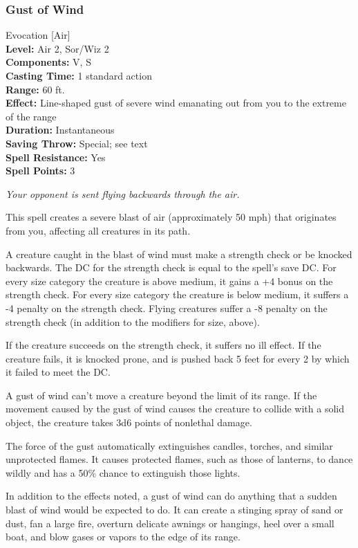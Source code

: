 \subsubsection{Gust of Wind}
\label{Spell:GustOfWind}
Evocation [Air]
\\ \textbf{Level:} Air 2, Sor/Wiz 2
\\ \textbf{Components:} V, S
\\ \textbf{Casting Time:} 1 standard action
\\ \textbf{Range:} 60 ft.
\\ \textbf{Effect:} Line-shaped gust of severe wind emanating out from you to the extreme of the range
\\ \textbf{Duration:} Instantaneous
\\ \textbf{Saving Throw:} Special; see text
\\ \textbf{Spell Resistance:} Yes
\\ \textbf{Spell Points:} 3

\emph{Your opponent is sent flying backwards through the air.}

This spell creates a severe blast of air (approximately 50 mph) that originates from you, 
affecting all creatures in its path.

A creature caught in the blast of wind must make a strength check or be knocked backwards.
The DC for the strength check is equal to the spell's save DC. 
For every size category the creature is above medium, it gains a +4 bonus on the strength check.
For every size category the creature is below medium, it suffers a -4 penalty on the strength check.
Flying creatures suffer a -8 penalty on the strength check (in addition to the modifiers for size, above).

If the creature succeeds on the strength check, it suffers no ill effect.
If the creature fails, it is knocked prone, 
and is pushed back 5 feet for every 2 by which it failed to meet the DC.

A gust of wind can't move a creature beyond the limit of its range.
If the movement caused by the gust of wind causes the creature to collide with a solid object,
the creature takes 3d6 points of nonlethal damage.

The force of the gust automatically extinguishes candles, torches, and similar unprotected flames. 
It causes protected flames, such as those of lanterns, to dance wildly and has a 50\% chance to extinguish those lights.

In addition to the effects noted, a gust of wind can do anything that a sudden blast of wind would be expected to do. It can create a stinging spray of sand or dust, fan a large fire, overturn delicate awnings or hangings, heel over a small boat, and blow gases or vapors to the edge of its range.

